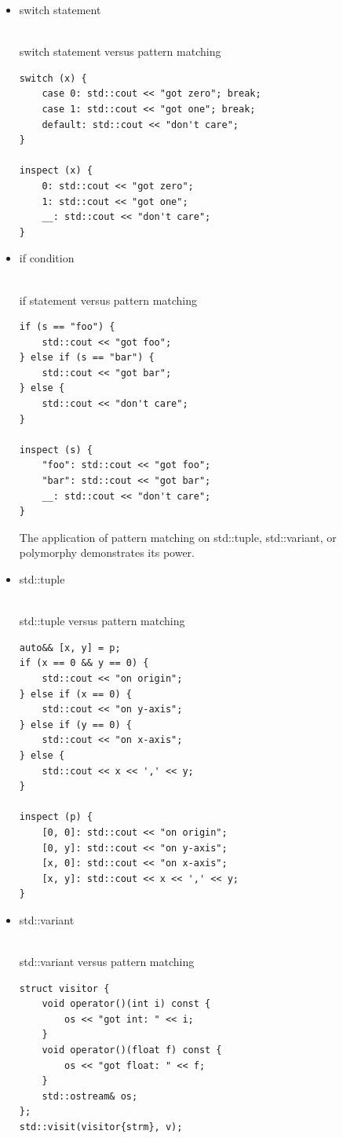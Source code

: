 \begin{itemize}
\item 
switch statement

\hspace*{\fill} \\ %
\noindent
switch statement versus pattern matching
\begin{lstlisting}[style=styleCXX]
switch (x) {
	case 0: std::cout << "got zero"; break;
	case 1: std::cout << "got one"; break;
	default: std::cout << "don't care";
}

inspect (x) {
	0: std::cout << "got zero";
	1: std::cout << "got one";
	__: std::cout << "don't care";
}
\end{lstlisting}

\item 
if condition

\hspace*{\fill} \\ %
\noindent
if statement versus pattern matching
\begin{lstlisting}[style=styleCXX]
if (s == "foo") {
	std::cout << "got foo";
} else if (s == "bar") {
	std::cout << "got bar";
} else {
	std::cout << "don't care";
}

inspect (s) {
	"foo": std::cout << "got foo";
	"bar": std::cout << "got bar";
	__: std::cout << "don't care";
}
\end{lstlisting}

The application of pattern matching on std::tuple, std::variant, or polymorphy demonstrates its power.

\item 
std::tuple

\hspace*{\fill} \\ %
\noindent
std::tuple versus pattern matching
\begin{lstlisting}[style=styleCXX]
auto&& [x, y] = p;
if (x == 0 && y == 0) {
	std::cout << "on origin";
} else if (x == 0) {
	std::cout << "on y-axis";
} else if (y == 0) {
	std::cout << "on x-axis";
} else {
	std::cout << x << ',' << y;
}

inspect (p) {
	[0, 0]: std::cout << "on origin";
	[0, y]: std::cout << "on y-axis";
	[x, 0]: std::cout << "on x-axis";
	[x, y]: std::cout << x << ',' << y;
}
\end{lstlisting}

\item 
std::variant

\hspace*{\fill} \\ %
\noindent
std::variant versus pattern matching
\begin{lstlisting}[style=styleCXX]
struct visitor {
	void operator()(int i) const {
		os << "got int: " << i;
	}
	void operator()(float f) const {
		os << "got float: " << f;
	}
	std::ostream& os;
};
std::visit(visitor{strm}, v);


\end{lstlisting}
\end{itemize}
